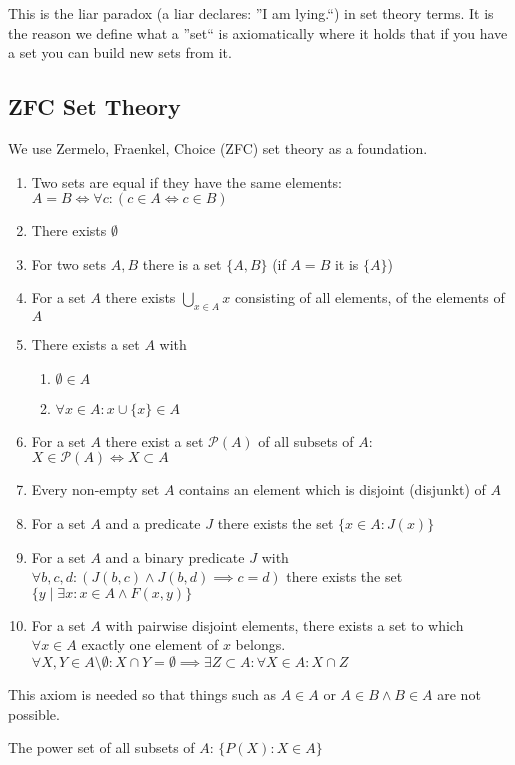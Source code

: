 This is the liar paradox (a liar declares: ''I am lying.``) in set theory terms.
It is the reason we define what a ''set`` is axiomatically where it holds that if you have a set you can build new sets from it.

\subsection{ZFC Set Theory}
\begin{definition}\label{def:zfc}
   We use Zermelo, Fraenkel, Choice (ZFC) set theory as a foundation.
   \begin{enumerate}
      \item Two sets are equal if they have the same elements: \(A = B \iff \forall c: (c \in A \iff c \in B)\)
      \item There exists \(\emptyset\)
      \item For two sets \(A, B\) there is a set \(\{A, B\}\) (if \(A = B\) it is \(\{A\}\))
      \item For a set \(A\) there exists \(\bigcup_{x \in A} x\) consisting of all elements, of the elements of \(A\)
      \item There exists a set \(A\) with
      \begin{enumerate}[label=\roman*, align=Center]
         \item \(\emptyset \in A\)
         \item \(\forall x \in A: x \cup \{x\} \in A\)
      \end{enumerate}
      \item For a set \(A\) there exist a set \(\mathcal{P}(A)\) of all subsets of \(A\): \(X \in \mathcal{P}(A) \iff X \subset A\)
      \item Every non-empty set \(A\) contains an element which is disjoint (disjunkt) of \(A\)
      \item For a set \(A\) and a predicate \(J\) there exists the set \(\{x \in A: J(x)\}\)
      \item For a set \(A\) and a binary predicate \(J\) with \(\forall b, c, d: (J(b, c) \land J(b, d) \implies c = d)\) there exists the set \(\{y \mid \exists x: x \in A \land F(x, y)\}\)
      \item For a set \(A\) with pairwise disjoint elements, there exists a set to which \(\forall x \in A\) exactly one element of \(x\) belongs.
         \(\forall X, Y \in A \setminus \emptyset: X \cap Y = \emptyset \implies \exists Z \subset A: \forall X \in A: X \cap Z\)
   \end{enumerate}
\end{definition}
\begin{example}[ZFC 7.]
   This axiom is needed so that things such as \(A \in A\) or \(A \in B \land B \in A\) are not possible.
\end{example}
\begin{example}[ZFC 9.]
   The power set of all subsets of \(A\): \(\{P(X): X \in A\}\)
\end{example}

